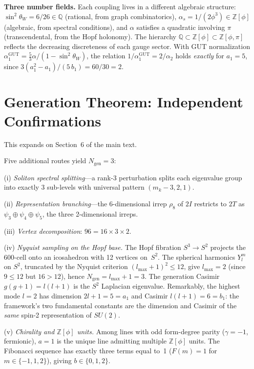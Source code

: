 \documentclass[12pt,a4paper]{article}
\theoremstyle{definition}
\begin{document}
\textbf{Three number fields.} Each coupling lives in a different algebraic structure: $\sin^2\theta_W = 6/26 \in \mathbb{Q}$ (rational, from graph combinatorics), $\alpha_s = 1/(2\phi^3) \in \mathbb{Z}[\phi]$ (algebraic, from spectral conditions), and $\alpha$ satisfies a quadratic involving $\pi$ (transcendental, from the Hopf holonomy). The hierarchy $\mathbb{Q} \subset \mathbb{Z}[\phi] \subset \mathbb{Z}[\phi, \pi]$ reflects the decreasing discreteness of each gauge sector. With GUT normalization $\alpha_1^{\text{GUT}} = \tfrac{5}{3}\alpha/(1 - \sin^2\theta_W)$, the relation $1/\alpha_1^{\text{GUT}} = 2/\alpha_2$ holds \emph{exactly} for $a_1 = 5$, since $3(a_1^2 - a_1)/(5\,b_1) = 60/30 = 2$.


\section{Generation Theorem: Independent Confirmations}
\label{sec:S-generations}

This expands on Section~6 of the main text.

Five additional routes yield $N_{\text{gen}} = 3$:

(i) \textit{Soliton spectral splitting}---a rank-3 perturbation splits each eigenvalue group into exactly 3 sub-levels with universal pattern $(m_k - 3, 2, 1)$.

(ii) \textit{Representation branching}---the 6-dimensional irrep $\rho_8$ of $2I$ restricts to $2T$ as $\psi_3 \oplus \psi_4 \oplus \psi_5$, the three 2-dimensional irreps.

(iii) \textit{Vertex decomposition}: $96 = 16 \times 3 \times 2$.

(iv) \textit{Nyquist sampling on the Hopf base.} The Hopf fibration $S^3 \to S^2$ projects the 600-cell onto an icosahedron with 12 vertices on~$S^2$. The spherical harmonics $Y_l^m$ on $S^2$, truncated by the Nyquist criterion $(l_{\max}+1)^2 \leq 12$, give $l_{\max} = 2$ (since $9 \leq 12$ but $16 > 12$), hence $N_{\text{gen}} = l_{\max} + 1 = 3$. The generation Casimir $g(g+1) = l(l+1)$ is the $S^2$ Laplacian eigenvalue. Remarkably, the highest mode $l = 2$ has dimension $2l+1 = 5 = a_1$ and Casimir $l(l+1) = 6 = b_1$: the framework's two fundamental constants are the dimension and Casimir of the \emph{same} spin-2 representation of $SU(2)$.

(v) \textit{Chirality and $\mathbb{Z}[\phi]$ units.}  Among lines with odd form-degree parity ($\gamma = -1$, fermionic), $a = 1$ is the unique line admitting multiple $\mathbb{Z}[\phi]$ units.  The Fibonacci sequence has exactly three terms equal to~1 ($F(m) = 1$ for $m \in \{-1, 1, 2\}$), giving $b \in \{0, 1, 2\}$.
\end{document}
